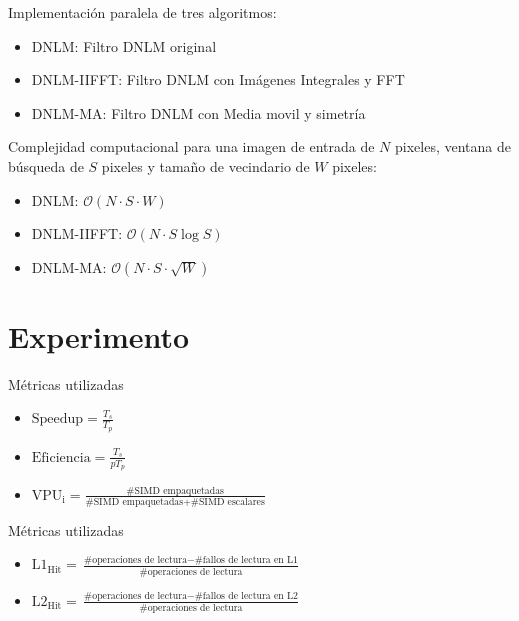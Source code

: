 \documentclass[15pt]{beamer} %
\begin{document}
\begin{frame}
	Implementaci\'on paralela de tres algoritmos:
	\begin{itemize}
	\item DNLM: Filtro DNLM original
	\item DNLM-IIFFT: Filtro DNLM con Im\'agenes Integrales y FFT
	\item DNLM-MA: Filtro DNLM con Media movil y simetr\'ia
	\end{itemize}
	
	Complejidad computacional para una imagen de entrada de $N$ pixeles, ventana de b\'usqueda de $S$ pixeles y tama\~no de vecindario de $W$ pixeles:
	\begin{itemize}
	\item DNLM: $\mathcal{O}(N\cdot S\cdot W)$ 
	\item DNLM-IIFFT: $\mathcal{O}(N \cdot S\log S)$
	\item DNLM-MA: $\mathcal{O}(N\cdot S\cdot \sqrt{W})$
	\end{itemize}

\end{frame}



\section{Experimento}

\begin{frame}{Métricas utilizadas}
	\begin{itemize}
		\item $\text{Speedup} = \frac{T_{s}}{T_{p}} $
		\vspace*{4mm}
		\item $\text{Eficiencia} = \frac{T_{s}}{p T_{p}}$
		\vspace*{4mm}
		\item $\text{VPU}_{\text{i}}= \frac{\text{\# SIMD empaquetadas}}{\text{\# SIMD empaquetadas}+\text{\# SIMD escalares}}$
	\end{itemize}	
\end{frame}
	
	
	
\begin{frame}{Métricas utilizadas}
	\begin{itemize}
	\item $\text{L1}_{\text{Hit}} = \frac{\text{\# operaciones de lectura}-\text{\# fallos de lectura en L1}}{\text{\# operaciones de lectura}}$
	\vspace*{4mm}
	\item $\text{L2}_{\text{Hit}} = \frac{\text{\# operaciones de lectura}-\text{\# fallos de lectura en L2}}{\text{\# operaciones de lectura}}$
	\end{itemize}
\end{frame}
	
\end{document}
